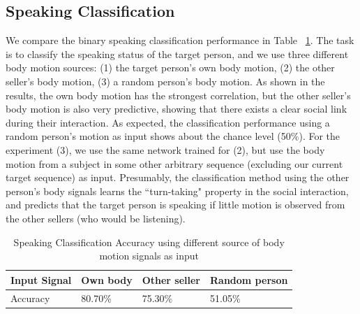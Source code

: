 \subsection{Speaking Classification}
We compare the binary speaking classification performance in Table ~\ref{table:speaking_class}. The task is to classify the speaking status of the target person, and we use three different body motion sources: (1) the target person's own body motion, (2) the other seller's body motion, (3) a random person's body motion. As shown in the results, the own body motion has the strongest correlation, but the other seller's body motion is also very predictive, showing that there exists a clear social link during their interaction. As expected, the classification performance using a random person's motion as input shows about the chance level (50\%). For the experiment (3), we use the same network trained for (2), but use the body motion from a subject in some other arbitrary sequence (excluding our current target sequence) as input. Presumably, the classification method using the other person's body signals learns the ``turn-taking" property in the social interaction, and predicts that the target person is speaking if little motion is observed from the other sellers (who would be listening). %
\begin{table}[t]
	\centering
	\footnotesize
	\caption{Speaking Classification Accuracy using different source of body motion signals as input}
	\label{table:speaking_class}
	\begin{tabular}{l| l| l| l}
		\hline
		Input Signal & Own body & Other seller & Random person\\
		\hline
		Accuracy & 80.70\% & 75.30\% & 51.05\%\\       %
		\hline
	\end{tabular}
\end{table}


